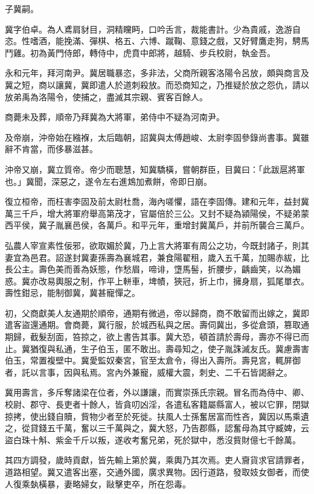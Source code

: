 \begin{pinyinscope}
子冀嗣。

冀字伯卓。為人鳶肩豺目，洞精矘眄，口吟舌言，裁能書計。少為貴戚，逸游自恣。性嗜酒，能挽滿、彈棋、格五、六博、蹴鞠、意錢之戲，又好臂鷹走狗，騁馬鬥雞。初為黃門侍郎，轉侍中，虎賁中郎將，越騎、步兵校尉，執金吾。

永和元年，拜河南尹。冀居職暴恣，多非法，父商所親客洛陽令呂放，頗與商言及冀之短，商以讓冀，冀即遣人於道刺殺放。而恐商知之，乃推疑於放之怨仇，請以放弟禹為洛陽令，使捕之，盡滅其宗親、賓客百餘人。

商薨未及葬，順帝乃拜冀為大將軍，弟侍中不疑為河南尹。

及帝崩，沖帝始在繈褓，太后臨朝，詔冀與太傅趙峻、太尉李固參錄尚書事。冀雖辭不肯當，而侈暴滋甚。

沖帝又崩，冀立質帝。帝少而聰慧，知冀驕橫，嘗朝群臣，目冀曰：「此跋扈將軍也。」冀聞，深惡之，遂令左右進鴆加煮餅，帝即日崩。

復立桓帝，而枉害李固及前太尉杜喬，海內嗟懼，語在李固傳。建和元年，益封冀萬三千戶，增大將軍府舉高第茂才，官屬倍於三公。又封不疑為潁陽侯，不疑弟蒙西平侯，冀子胤襄邑侯，各萬戶。和平元年，重增封冀萬戶，并前所襲合三萬戶。

弘農人宰宣素性佞邪，欲取媚於冀，乃上言大將軍有周公之功，今既封諸子，則其妻宜為邑君。詔遂封冀妻孫壽為襄城君，兼食陽翟租，歲入五千萬，加賜赤紱，比長公主。壽色美而善為妖態，作愁眉，啼诽，墯馬髻，折腰步，齲齒笑，以為媚惑。冀亦改易輿服之制，作平上軿車，埤幘，狹冠，折上巾，擁身扇，狐尾單衣。壽性鉗忌，能制御冀，冀甚寵憚之。

初，父商獻美人友通期於順帝，通期有微過，帝以歸商，商不敢留而出嫁之，冀即遣客盜還通期。會商薨，冀行服，於城西私與之居。壽伺冀出，多從倉頭，篡取通期歸，截髮刮面，笞掠之，欲上書告其事。冀大恐，頓首請於壽母，壽亦不得已而止。冀猶復與私通，生子伯玉，匿不敢出。壽尋知之，使子胤誅滅友氏。冀慮壽害伯玉，常置複壁中。冀愛監奴秦宮，官至太倉令，得出入壽所。壽見宮，輒屏御者，託以言事，因與私焉。宮內外兼寵，威權大震，刺史、二千石皆謁辭之。

冀用壽言，多斥奪諸梁在位者，外以謙讓，而實崇孫氏宗親。冒名而為侍中、卿、校尉、郡守、長吏者十餘人，皆貪叨凶淫，各遣私客籍屬縣富人，被以它罪，閉獄掠拷，使出錢自贖，貲物少者至於死徙。扶風人士孫奮居富而性吝，冀因以馬乘遺之，從貸錢五千萬，奮以三千萬與之，冀大怒，乃告郡縣，認奮母為其守臧婢，云盜白珠十斛、紫金千斤以叛，遂收考奮兄弟，死於獄中，悉沒貲財億七千餘萬。

其四方調發，歲時貢獻，皆先輸上第於冀，乘輿乃其次焉。吏人齎貨求官請罪者，道路相望。冀又遣客出塞，交通外國，廣求異物。因行道路，發取妓女御者，而使人復乘埶橫暴，妻略婦女，敺擊吏卒，所在怨毒。


\end{pinyinscope}
